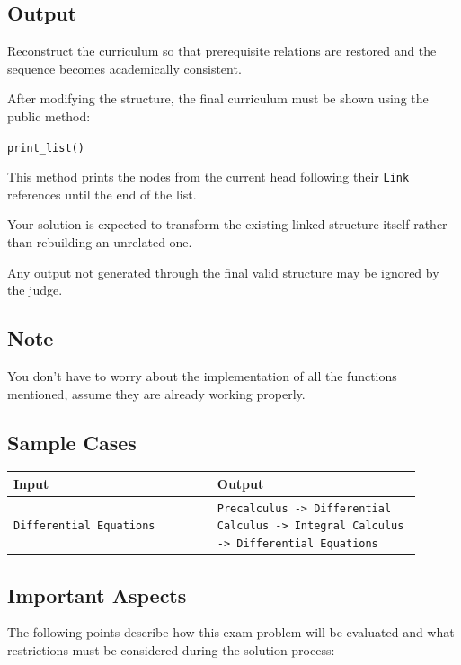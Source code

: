 \documentclass[11pt,a4paper]{article}
\newenvironment{sample}[2]{
  \begin{tcolorbox}[title=Test \##1, colback=white, colframe=black, sharp corners,
    fonttitle=\bfseries, breakable]
    \begin{tabular}{|p{0.45\linewidth}|p{0.45\linewidth}|}
      \hline
      \textbf{Input} & \textbf{Output} \\
      \hline
      }{\\ \hline
    \end{tabular}
  \end{tcolorbox}
}
\begin{document}
\subsection*{Output}

Reconstruct the curriculum so that prerequisite relations are restored and the sequence becomes academically consistent.

After modifying the structure, the final curriculum must be shown using the public method:

\lstinline[style=pythonstyle]|print_list()|

This method prints the nodes from the current head following their \texttt{Link} references until the end of the list.

Your solution is expected to transform the existing linked structure itself rather than rebuilding an unrelated one.

Any output not generated through the final valid structure may be ignored by the judge.

\subsection*{Note}

You don't have to worry about the implementation of all the functions mentioned, assume they are already working properly.

\subsection*{Sample Cases}



\begin{sample}{1}{}
  \texttt{Differential Equations}

  &
  \texttt{Precalculus -> Differential Calculus -> Integral Calculus -> Differential Equations}

\end{sample}
 

\subsection*{Important Aspects}

The following points describe how this exam problem will be evaluated and what restrictions must be considered during the solution process:
\end{document}
